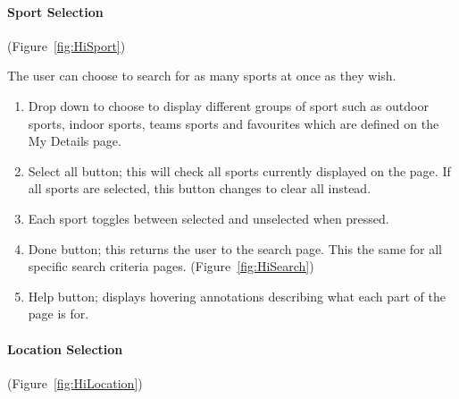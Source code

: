 \paragraph{Sport Selection} (Figure~\ref{fig:HiSport})


The user can choose to search for as many sports at once as they wish.
\begin{enumerate}
	\item Drop down to choose to display different groups of sport such as
		outdoor sports, indoor sports, teams sports and favourites which are
		defined on the My Details page.
	\item Select all button; this will check all sports currently displayed on
		the page. If all sports are selected, this button changes to clear all
		instead.
	\item Each sport toggles between selected and unselected when pressed.
	\item Done button; this returns the user to the search page. This the same
		for all specific search criteria pages. (Figure~\ref{fig:HiSearch})
	\item Help button; displays hovering annotations describing what each part
		of the page is for.
\end{enumerate}

\paragraph{Location Selection} (Figure~\ref{fig:HiLocation})


